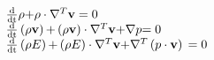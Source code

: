 \documentclass{minimal}
\begin{document}
 \begin{align*}
\begin{array}{l} 
  {\textstyle{{\rm{d}} \over {{\rm{dt}}}}}\rho {\rm{  +  }}\rho  \cdot \nabla _{}^T{\mathbf{v}}{\rm{ }} = {\rm{ }}0\\ 
  {\textstyle{{\rm{d}} \over {{\rm{dt}}}}}\left( {\rho {\mathbf{v}}} \right){\rm{  +  }}\left( {\rho {\mathbf{v}}} \right) \cdot \nabla _{}^T{\mathbf{v}}{\rm{  +  }}\nabla p{\rm{  =  0}}\\ 
  {\textstyle{{\rm{d}} \over {{\rm{dt}}}}}\left( {\rho E} \right){\rm{  +  }}\left( {\rho E} \right) \cdot \nabla _{}^T{\mathbf{v}}{\rm{  +  }}\nabla _{}^T\left( {p \cdot {\mathbf{v}}} \right){\rm{ }} = {\rm{ }}0 
  \end{array}
 \end{align*}
 
\end{document}
